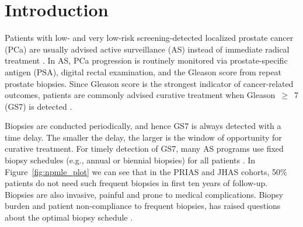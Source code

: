 \section{Introduction}
Patients with low- and very low-risk screening-detected localized prostate cancer (PCa) are usually advised active surveillance (AS) instead of immediate radical treatment \citep{briganti2018active}. In AS, PCa progression is routinely monitored via prostate-specific antigen (PSA), digital rectal examination, and the Gleason score from repeat prostate biopsies. Since Gleason score is the strongest indicator of cancer-related outcomes, patients are commonly advised curative treatment when Gleason~$\geq$~7 (GS7) is detected \citep{bul2013active}.

Biopsies are conducted periodically, and hence GS7 is always detected with a time delay. The smaller the delay, the larger is the window of opportunity for curative treatment. For timely detection of GS7, many AS programs use fixed biopsy schedules (e.g., annual or biennial biopsies) for all patients \citep{nieboer2018active,loeb2014heterogeneity}. In Figure~\ref{fig:npmle_plot} we can see that in the PRIAS and JHAS cohorts, 50\% patients do not need such frequent biopsies in first ten years of follow-up. Biopsies are also invasive, painful and prone to medical complications. Biopsy burden and patient non-compliance \citep{bokhorst2015compliance} to frequent biopsies, has raised questions about the optimal biopsy schedule \citep{inoue2018comparative, bratt2013study}.

